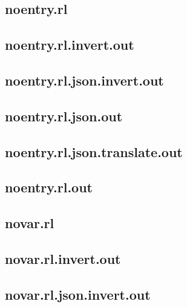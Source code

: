 \subsection{noentry.rl}
\label{app:noentry_rl}

\subsection{noentry.rl.invert.out}
\label{app:noentry_rl.invert.out}

\subsection{noentry.rl.json.invert.out}
\label{app:noentry_rl.json.invert.out}

\subsection{noentry.rl.json.out}
\label{app:noentry_rl.json.out}

\subsection{noentry.rl.json.translate.out}
\label{app:noentry_rl.json.translate.out}

\subsection{noentry.rl.out}
\label{app:noentry_rl.out}

\subsection{novar.rl}
\label{app:novar_rl}

\subsection{novar.rl.invert.out}
\label{app:novar_rl.invert.out}

\subsection{novar.rl.json.invert.out}
\label{app:novar_rl.json.invert.out}

